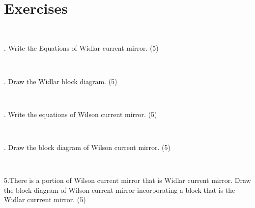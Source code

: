 \documentclass[10pt,a4paper]{article}
\begin{document}
\begin{CJK*}{UTF8}{gbsn}
 \par \ \par\noindent \section{Exercises}
 \par \ \par{}. Write the Equations of Widlar current mirror. (5)
 \par \ \par{}. Draw the Widlar block diagram. (5) 
 \par \ \par{}. Write the equations of Wilson current mirror. (5)
 \par \ \par{}. Draw the block diagram of Wilson current mirror. (5)
 \par \ \par\noindent 5.There is a portion of Wilson current mirror that is Widlar current mirror. Draw the block diagram of Wilson current mirror incorporating a block that is the Widlar currrent mirror. (5)
 \par \ \par\noindent \nocite{2}
 \par \ \par\noindent \nocite{201}
 \par \ \par\noindent \nocite{202}
 \par \ \par\noindent \nocite{301}
 \par \ \par\noindent \nocite{310}
 \par \ \par\noindent  
 
 \par \ \par\noindent \end{CJK*}
 \par \ \par
\end{document}
